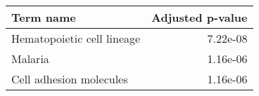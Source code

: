 \begin{tabular}{lr}
\toprule
                 Term name &  Adjusted p-value \\
\midrule
Hematopoietic cell lineage &          7.22e-08 \\
                   Malaria &          1.16e-06 \\
   Cell adhesion molecules &          1.16e-06 \\
\bottomrule
\end{tabular}

